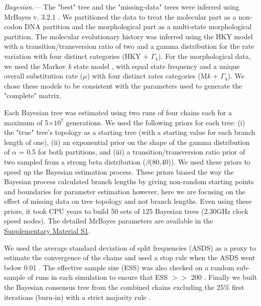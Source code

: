 \documentclass[12pt,letterpaper]{article}
\renewcommand{\subsubsection}[1]{%
\vspace{2ex}
\noindent
\textit{#1.}---}
\begin{document}
\subsubsection{Bayesian}
The "best" tree and the "missing-data" trees were inferred using MrBayes v. 3.2.1 \citep{Ronquist2012mrbayes}. We partitioned the data to treat the molecular part as a non-codon DNA partition and the morphological part as a multi-state morphological partition. The molecular evolutionary history was inferred using the HKY model with a transition/transversion ratio of two \citep{douadycomparison2003} and a gamma distribution for the rate variation with four distinct categories (HKY + $\Gamma_4$). For the morphological data, we used the Markov \textit{k} state model \citep{lewisa2001}, with equal state frequency and a unique overall substitution rate ($\mu$) with four distinct rates categories (M\textit{k} + $\Gamma_4$). We chose these models to be consistent with the parameters used to generate the "complete" matrix.

Each Bayesian tree was estimated using two runs of four chains each for a maximum of 5$\times$$10^7$ generations. We used the following priors for each tree: (i) the "true" tree’s topology as a starting tree (with a starting value for each branch length of one), (ii) an exponential prior on the shape of the gamma distribution of $\alpha$ = 0.5 for both partitions, and (iii) a transition/transversion ratio prior of two sampled from a strong beta distribution ($\beta$(80,40)). We used these priors to speed up the Bayesian estimation process. These priors biased the way the Bayesian process calculated branch lengths by giving non-random starting points and boundaries for parameter estimation however, here we are focusing on the effect of missing data on tree topology and not branch lengths. Even using these priors, it took  CPU years to build 50 sets of 125 Bayesian trees (2.30GHz clock speed nodes). The detailed MrBayes parameters are available in the \hyperref[SupplementaryMaterial]{Supplementary Material S1}.

We used the average standard deviation of split frequencies (ASDS) as a proxy to estimate the convergence of the chains and used a stop rule when the ASDS went below 0.01 \citep{Ronquist2012mrbayes}. The effective sample size (ESS) was also checked on a random sub-sample of runs in each simulation to ensure that ESS $>>$ 200 \citep{drummond2006ess}. Finally we built the Bayesian consensus tree from the combined chains excluding the 25\% first iterations (burn-in) with a strict majority rule \citep{Ronquist2012mrbayes}.
\end{document}
